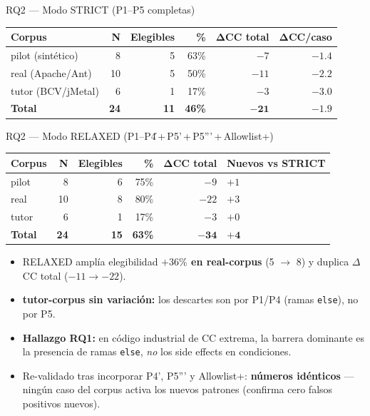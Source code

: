 \documentclass[aspectratio=169, 10pt]{beamer}
\newcommand{\ok}[1]{\textcolor{okgreen}{\textbf{#1}}}
\newcommand{\warn}[1]{\textcolor{warnred}{\textbf{#1}}}
\begin{document}
\begin{frame}{RQ2 --- Modo STRICT (P1--P5 completas)}
  \begin{table}
    \centering
    \footnotesize
    \begin{tabular}{lrrrrr}
      \toprule
      \textbf{Corpus} & \textbf{N} & \textbf{Elegibles} & \textbf{\%} &
        $\boldsymbol{\Delta}$\textbf{CC total} & $\boldsymbol{\Delta}$\textbf{CC/caso} \\
      \midrule
      pilot (sintético)   & 8  & 5  & 63\% & $-7$  & $-1.4$ \\
      real (Apache/Ant)   & 10 & 5  & 50\% & $-11$ & $-2.2$ \\
      tutor (BCV/jMetal)  & 6  & 1  & 17\% & $-3$  & $-3.0$ \\
      \midrule
      \textbf{Total}      & \textbf{24} & \textbf{11} & \textbf{46\%}
        & $\boldsymbol{-21}$ & $\boldsymbol{-1.9}$ \\
      \bottomrule
    \end{tabular}
  \end{table}
\end{frame}

\begin{frame}{RQ2 --- Modo RELAXED (P1--P4\'\,+\,P5'\,+\,P5'''\,+\,Allowlist+)}
  \begin{table}
    \centering
    \footnotesize
    \begin{tabular}{lrrrrl}
      \toprule
      \textbf{Corpus} & \textbf{N} & \textbf{Elegibles} & \textbf{\%} &
        $\boldsymbol{\Delta}$\textbf{CC total} & \textbf{Nuevos vs STRICT} \\
      \midrule
      pilot  & 8  & 6  & 75\%  & $-9$  & $+1$ \\
      real   & 10 & 8  & 80\%  & $-22$ & $+3$ \\
      tutor  & 6  & 1  & 17\%  & $-3$  & $+0$ \\
      \midrule
      \textbf{Total} & \textbf{24} & \textbf{15} & \textbf{63\%}
        & $\boldsymbol{-34}$ & $\boldsymbol{+4}$ \\
      \bottomrule
    \end{tabular}
  \end{table}

  \vspace{0.5em}
  \begin{itemize}
    \item RELAXED amplía elegibilidad \ok{$+36\%$ en real-corpus} (5 $\to$ 8)
          y duplica $\Delta$CC total ($-11 \to -22$).
    \item \warn{tutor-corpus sin variación:} los descartes son por P1/P4
          (ramas \texttt{else}), no por P5.
    \item \textbf{Hallazgo RQ1:} en código industrial de CC extrema, la
          barrera dominante es la presencia de ramas \texttt{else},
          \emph{no} los side effects en condiciones.
    \item \footnotesize Re-validado tras incorporar P4', P5''' y Allowlist+:
          \ok{números idénticos} --- ningún caso del corpus activa los nuevos patrones
          (confirma cero falsos positivos nuevos).
  \end{itemize}
\end{frame}
\end{document}
